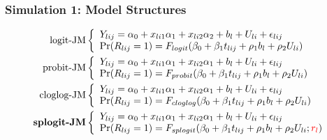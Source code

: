 \documentclass[fleqn]{beamer}
\begin{document}
\begin{frame}
\frametitle{Simulation 1: Model Structures}
\footnotesize
\begin{align*}
\mbox{logit-JM} & \left \{\begin{array}{ll}
        Y_{lij}= \alpha_0 + x_{li1}\alpha_1 + x_{li2}\alpha_2 + b_l + U_{li} + \epsilon_{lij} \\
       \mbox{Pr}(R_{lij}=1)=F_{logit}(\beta_0 + \beta_1 t_{lij} + \rho_1 b_l + \rho_2 U_{li}) \\
\end{array}\right. \\
\mbox{probit-JM} & \left \{\begin{array}{ll}
       Y_{lij}= \alpha_0 + x_{li1}\alpha_1 + x_{li2}\alpha_1+b_l+U_{li} + \epsilon_{lij} \\
       \mbox{Pr}(R_{lij}=1)=F_{probit}(\beta_0 + \beta_1 t_{lij} +\rho_1 b_l + \rho_2 U_{li}) \\
\end{array}\right. \\
\mbox{cloglog-JM} & \left \{\begin{array}{ll}
       Y_{lij}= \alpha_0 + x_{li1}\alpha_1 + x_{li2}\alpha_1+b_l+U_{li} + \epsilon_{lij} \\
       \mbox{Pr}(R_{lij}=1)=F_{cloglog}(\beta_0 + \beta_1 t_{lij} + \rho_1 b_l + \rho_2 U_{li}) \\
        \end{array}\right.\\
\mbox{\bf splogit-JM} & \left \{\begin{array}{ll}
       Y_{lij}= \alpha_0 + x_{li1}\alpha_1 + x_{li2}\alpha_1+b_l+U_{li} + \epsilon_{lij} \\
       \mbox{Pr}(R_{lij}=1)=F_{splogit}(\beta_0 + \beta_1 t_{lij} + \rho_1 b_l + \rho_2 U_{li};\textcolor{red}{r_l}) \\
       \end{array}\right.        
\end{align*}
\end{frame}
\end{document}
